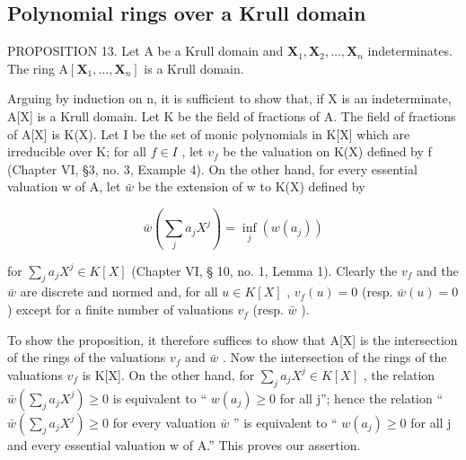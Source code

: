 \subsection{Polynomial rings over a Krull domain}

PROPOSITION 13. Let A be a Krull domain and \(\mathbf{X}_1, \mathbf{X}_2, \ldots, \mathbf{X}_n\) indeterminates. The ring \(\mathrm{A}[\mathbf{X}_1, \ldots, \mathbf{X}_n]\) is a Krull domain.

Arguing by induction on n, it is sufficient to show that, if X is an indeterminate, A{[}X{]} is a Krull domain. Let K be the field of fractions of A. The field of fractions of A{[}X{]} is K(X). Let I be the set of monic polynomials in K{[}X{]} which are irreducible over K; for all \(f \in I\) , let \(v_{f}\) be the valuation on K(X) defined by f (Chapter VI, §3, no. 3, Example 4). On the other hand, for every essential valuation w of A, let \(\bar{w}\) be the extension of w to K(X) defined by

\[
\bar {w} \left(\sum_ {j} a _ {j} X ^ {j}\right) = \inf _ {j} (w (a _ {j}))
\]

for \(\sum_{j} a_j X^j \in K[X]\) (Chapter VI, § 10, no. 1, Lemma 1). Clearly the \(v_f\) and the \(\bar{w}\) are discrete and normed and, for all \(u \in K[X]\) , \(v_f(u) = 0\) (resp. \(\bar{w}(u) = 0\) ) except for a finite number of valuations \(v_f\) (resp. \(\bar{w}\) ).

To show the proposition, it therefore suffices to show that A{[}X{]} is the intersection of the rings of the valuations \(v_{f}\) and \(\bar{w}\) . Now the intersection of the rings of the valuations \(v_{f}\) is K{[}X{]}. On the other hand, for \(\sum_{j} a_{j} X^{j} \in K[X]\) , the relation \(\bar{w}\left(\sum_{j} a_{j} X^{j}\right) \geqslant 0\) is equivalent to `` \(w(a_{j}) \geqslant 0\) for all j''; hence the relation `` \(\bar{w}\left(\sum_{j} a_{j} X^{j}\right) \geqslant 0\) for every valuation \(\bar{w}\) '' is equivalent to `` \(w(a_{j}) \geqslant 0\) for all j and every essential valuation w of A.'' This proves our assertion.

